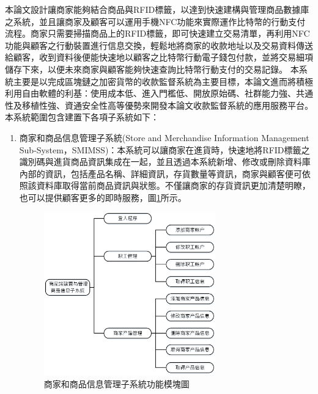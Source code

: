 	本論文設計讓商家能夠結合商品與RFID標籤，以達到快速建構與管理商品數據庫之系統，並且讓商家及顧客可以運用手機NFC功能來實際運作比特幣的行動支付流程。商家只需要掃描商品上的RFID標籤，即可快速建立交易清單，再利用NFC功能與顧客之行動裝置進行信息交換，輕鬆地將商家的收款地址以及交易資料傳送給顧客，收到資料後便能快速地以顧客之比特幣行動電子錢包付款，並將交易細項儲存下來，以便未來商家與顧客能夠快速查詢比特幣行動支付的交易記錄。
	本系統主要是以完成區塊鏈之加密貨幣的收款監督系統為主要目標，本論文進而將積極利用自由軟體的利基：使用成本低、進入門檻低、開放原始碼、社群能力強、共通性及移植性強、資通安全性高等優勢來開發本論文收款監督系統的應用服務平台。本系統範圍包含建置下各項子系統如下：
		\begin{enumerate}
		\item 商家和商品信息管理子系統(Store and Merchandise Information Management Sub-System，SMIMSS)：本系統可以讓商家在進貨時，快速地將RFID標籤之識別碼與進貨商品資訊集成在一起，並且透過本系統新增、修改或刪除資料庫內部的資訊，包括產品名稱、詳細資訊，存貨數量等資訊，商家與顧客便可依照該資料庫取得當前商品資訊與狀態。不僅讓商家的存貨資訊更加清楚明瞭，也可以提供顧客更多的即時服務，圖\ref{model1}所示。

			\begin{figure}[!htbp]
			\centering
			\includegraphics[width = 0.7\textwidth]{model1.jpg}
			\caption{商家和商品信息管理子系統功能模塊圖}\label{model1}
			\end{figure}




\end{enumerate}
